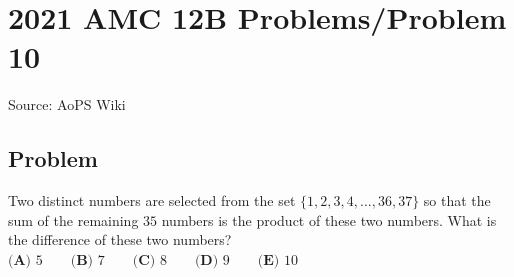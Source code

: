 \documentclass[12pt]{article}
\begin{document}
\section*{{2021 AMC 12B Problems/Problem 10}}
Source: AoPS Wiki

\subsection*{Problem}
Two distinct numbers are selected from the set $\{1,2,3,4,\dots,36,37\}$ so that the sum of the remaining $35$ numbers is the product of these two numbers. What is the difference of these two numbers? $\textbf{(A) }5 \qquad \textbf{(B) }7 \qquad \textbf{(C) }8\qquad \textbf{(D) }9 \qquad \textbf{(E) }10$
\end{document}

